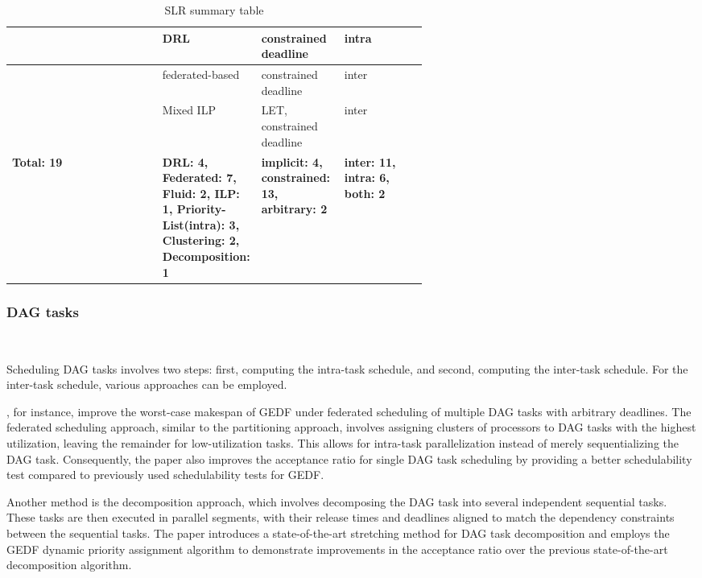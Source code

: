 \begin{table}
\begin{tabular}[]{|l|p{0.20\linewidth}|p{0.20\linewidth}|p{0.20\linewidth}|}
        \hline
        \cite{GuanFRTDS2020RL} & DRL & constrained deadline & intra \\
        \hline
        \cite{JiangVirtuallyFederatedSched2021} & federated-based & constrained deadline & inter\\
        \hline
        \cite{Pazzaglia2021DMALETtransfer} & Mixed ILP & LET, constrained deadline & inter\\
        \hline
        \textbf{Total: 19} & \textbf{DRL: 4, Federated: 7, Fluid: 2, ILP: 1, Priority-List(intra): 3, Clustering: 2, Decomposition: 1}
        & \textbf{implicit: 4, constrained: 13, arbitrary: 2} & \textbf{inter: 11, intra: 6, both: 2} \\
        \hline
    \end{tabular}
    \caption{SLR summary table}
    \label{tab:slt_sum_table}
\end{table}


\subsubsection{DAG tasks}
~

Scheduling DAG tasks involves two steps: first, 
computing the intra-task schedule, and second, computing 
the inter-task schedule. For the inter-task schedule, various 
approaches can be employed.

\cite{WangGEDFDag2019}, for instance, improve the worst-case 
makespan of GEDF under federated scheduling of multiple DAG tasks 
with arbitrary deadlines. The federated scheduling approach, 
similar to the partitioning approach, involves assigning clusters 
of processors to DAG tasks with the highest utilization, leaving 
the remainder for low-utilization tasks. This allows for 
intra-task parallelization instead of merely sequentializing 
the DAG task. Consequently, the paper also improves the acceptance 
ratio for single DAG task scheduling by providing a better 
schedulability test compared to previously used 
schedulability tests for GEDF.

Another method is the decomposition approach, which involves 
decomposing the DAG task into several independent sequential tasks. 
These tasks are then executed in parallel segments, with their 
release times and deadlines aligned to match the dependency constraints 
between the sequential tasks\cite{CaoStretchingDAGs2020}. The paper 
\cite{CaoStretchingDAGs2020} introduces a state-of-the-art 
stretching method for DAG task decomposition and employs the GEDF 
dynamic priority assignment algorithm to demonstrate improvements 
in the acceptance ratio over the previous state-of-the-art 
decomposition algorithm.

